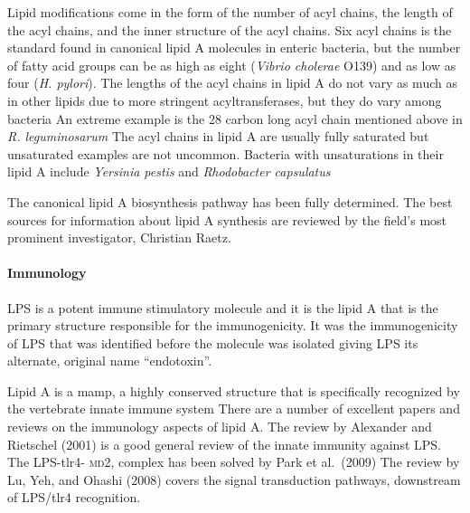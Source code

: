 Lipid modifications come in the form of the number of acyl chains, the length of the acyl chains, and the inner structure of the acyl chains. Six acyl chains is the standard found
in canonical lipid A molecules in enteric bacteria, but the number of fatty acid groups can be as high as eight (\eg \textit{Vibrio cholerae}
O139) and as low as four (\eg \textit{H. pylori}). The lengths of the acyl chains in lipid A do not vary
as much as in other lipids due to more stringent acyltransferases, but they do vary among bacteria An extreme example is the 28 carbon long acyl
chain mentioned above in \textit{R. leguminosarum} The acyl chains in lipid A are usually fully saturated but unsaturated examples are not uncommon.
Bacteria with unsaturations in their lipid A include \caulobacter{} \textit{Yersinia pestis} and \textit{Rhodobacter
capsulatus}

The canonical lipid A biosynthesis pathway has been fully determined. The best sources for information about lipid A synthesis are reviewed by the field's most prominent
investigator, Christian Raetz.

    \paragraph{Immunology}

\ac{LPS} is a potent immune stimulatory molecule and it is the lipid A that is the primary structure responsible for the immunogenicity. It was the immunogenicity of \ac{LPS} that
was identified before the molecule was isolated giving \ac{LPS} its alternate, original name ``endotoxin''.

Lipid A is a \ac{mamp}, a highly conserved structure that is specifically recognized by the vertebrate innate immune system There are a number of
excellent papers and reviews on the immunology aspects of lipid A. The review by Alexander and Rietschel (2001) is a good general review of the
innate immunity against \ac{LPS}. The \ac{LPS}-\ac{tlr4}- \textsc{md}2, complex has been solved by Park et al.~(2009) The review by Lu, Yeh, and
Ohashi (2008) covers the signal transduction pathways, downstream of \ac{LPS}/\ac{tlr4} recognition.


